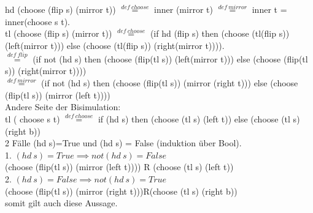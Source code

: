 \documentclass{article}
\begin{document}
	hd (choose (flip s) (mirror t)) $\stackrel{def\ choose}{=}$ inner (mirror t) $\stackrel{def\ mirror}{=}$ inner t = inner(choose s t).\\
	tl (choose (flip s) (mirror t)) $\stackrel{def\ choose}{=}$ (if hd (flip s) then (choose (tl(flip s)) (left(mirror t))) else (choose (tl(flip s)) (right(mirror t)))).\\
	$\stackrel{def\ flip}{=}$ (if not (hd s) then (choose (flip(tl s)) (left(mirror t))) else (choose (flip(tl s)) (right(mirror t))))\\
	$\stackrel{def\ mirror}{=}$ (if not (hd s) then (choose (flip(tl s)) (mirror (right t))) else (choose (flip(tl s)) (mirror (left t))))\\
	Andere Seite der Bisimulation:\\
	tl ( choose s t) $\stackrel{def\ choose}{=}$ if (hd s) then (choose (tl s) (left t)) else (choose (tl s) (right b))\\
	2 Fälle (hd s)=True und (hd s) = False (induktion über Bool).\\
	1. $(hd\ s)=True\implies not (hd\ s) = False$\\
	(choose (flip(tl s)) (mirror (left t)))) R (choose (tl s) (left t))\\
	2. $(hd\ s)=False\implies not (hd\ s) = True$\\
	(choose (flip(tl s)) (mirror (right t)))R(choose (tl s) (right b))\\
	somit gilt auch diese Aussage.\\
\end{document}
